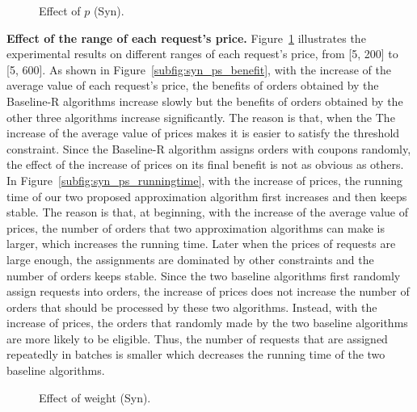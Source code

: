 \begin{figure}[t!]\centering 
	\subfigcapskip=-5pt
	\vspace{1ex}
	\vspace{-2ex}
	\addtocounter{subfigure}{-1}
	\figureCaptionMargin
		\vspace{1ex}
	\caption{\small Effect of $p$ (Syn).}\figureBelowMargin
	\label{fig:syn_p}
\end{figure}
\textbf{Effect of the range of each request's price.}  Figure~\ref{fig:syn_p} illustrates the experimental results on different ranges of each request's price, from [5, 200] to [5, 600]. As shown in Figure~\ref{subfig:syn_ps_benefit}, with the increase of the average value of each request's price, the benefits of orders obtained by the Baseline-R algorithms increase slowly but the benefits of orders obtained by the other three algorithms increase significantly. The reason is that, when the The increase of the average value of prices makes it is easier to satisfy the threshold constraint. Since the Baseline-R algorithm assigns orders with coupons randomly, the effect of the increase of prices on its final benefit is not as obvious as others. In Figure~\ref{subfig:syn_ps_runningtime}, with the increase of prices, the running time of our two proposed approximation algorithm first increases and then keeps stable. The reason is that, at beginning, with the increase of the average value of prices, the number of orders that two approximation algorithms can make is larger, which increases the running time. Later when the prices of requests are large enough, the assignments are dominated by other constraints and the number of orders keeps stable. Since the two baseline algorithms first randomly assign requests into orders, the increase of prices does not increase the number of orders that should be processed by these two algorithms. Instead, with the increase of prices, the orders that randomly made by the two baseline algorithms are more likely to be eligible. Thus, the number of requests that are assigned repeatedly in batches is smaller which decreases the running time of the two baseline algorithms.

\begin{figure}[t!]\centering
	\subfigcapskip=-5pt
	\vspace{-2ex}
	\addtocounter{subfigure}{-1}
	\figureCaptionMargin
		\vspace{1ex}
	\caption{\small Effect of weight (Syn).}\figureBelowMargin
	\label{fig:syn_ws}
\end{figure}

